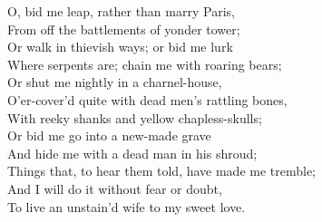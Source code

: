 \begin{speech}
O, bid me leap, rather than marry Paris, \\
From off the battlements of yonder tower; \\
Or walk in thievish ways; or bid me lurk \\
Where serpents are; chain me with roaring bears; \\
Or shut me nightly in a charnel-house, \\
O'er-cover'd quite with dead men's rattling bones, \\
With reeky shanks and yellow chapless-skulls; \\
Or bid me go into a new-made grave \\
And hide me with a dead man in his shroud; \\
Things that, to hear them told, have made me tremble; \\
And I will do it without fear or doubt, \\
To live an unstain'd wife to my sweet love. \\
\end{speech}
